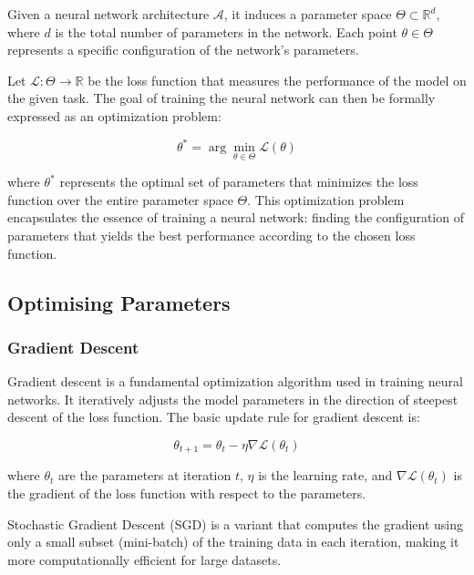 \documentclass[a4paper, oneside]{discothesis}
\begin{document}
Given a neural network architecture $\mathcal{A}$, it induces a parameter space $\Theta \subset \mathbb{R}^d$, where $d$ is the total number of parameters in the network. Each point $\theta \in \Theta$ represents a specific configuration of the network's parameters.

Let $\mathcal{L}: \Theta \rightarrow \mathbb{R}$ be the loss function that measures the performance of the model on the given task. The goal of training the neural network can then be formally expressed as an optimization problem:

\begin{equation}
    \theta^* = \arg\min_{\theta \in \Theta} \mathcal{L}(\theta)
\end{equation}

where $\theta^*$ represents the optimal set of parameters that minimizes the loss function over the entire parameter space $\Theta$. This optimization problem encapsulates the essence of training a neural network: finding the configuration of parameters that yields the best performance according to the chosen loss function.


\subsection{Optimising Parameters}

\subsubsection{Gradient Descent}

Gradient descent is a fundamental optimization algorithm used in training neural networks. It iteratively adjusts the model parameters in the direction of steepest descent of the loss function. The basic update rule for gradient descent is:

\begin{equation}
    \theta_{t+1} = \theta_t - \eta \nabla \mathcal{L}(\theta_t)
\end{equation}

where $\theta_t$ are the parameters at iteration $t$, $\eta$ is the learning rate, and $\nabla \mathcal{L}(\theta_t)$ is the gradient of the loss function with respect to the parameters.

Stochastic Gradient Descent (SGD) is a variant that computes the gradient using only a small subset (mini-batch) of the training data in each iteration, making it more computationally efficient for large datasets.
\end{document}
